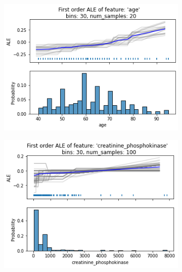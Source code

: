 \documentclass[11pt,
  a4paper,
  parskip=half, %
  BCOR=10mm, %
  english,
  ]{article}
\begin{document}
\begin{figure}[htp!]
    \begin{subfigure}[t]{.49\textwidth}
        \includegraphics[width=\linewidth]{images/ALE_age.png}
        \caption{}
        \label{fig:ALE-1/age}
    \end{subfigure}
    \hfill
    \begin{subfigure}[t]{.49\textwidth}
        \includegraphics[width=\linewidth]{images/ALE_creatine_phosphokinase.png}
        \caption{}
        \label{fig:ALE-1/creatine-phosphokinase}
    \end{subfigure} \\
        \begin{subfigure}[t]{.49\textwidth}

\end{subfigure}
\end{figure}
\end{document}
